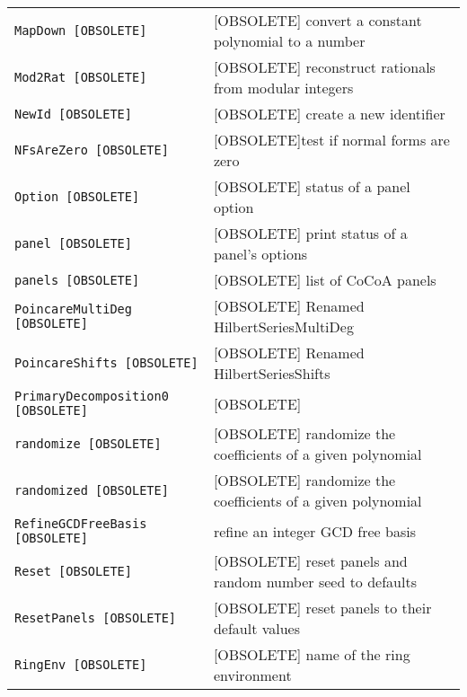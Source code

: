 \documentclass[a4paper]{mybook}
\begin{document}
\begin{center}
\begin{longtable}{ll}
{\verb~MapDown [OBSOLETE]~} &
      [OBSOLETE] convert a constant polynomial to a number\\
   
{\verb~Mod2Rat [OBSOLETE]~} &
      [OBSOLETE] reconstruct rationals from modular integers\\
   
{\verb~NewId [OBSOLETE]~} &
      [OBSOLETE] create a new identifier\\
   
{\verb~NFsAreZero [OBSOLETE]~} &
      [OBSOLETE]test if normal forms are zero\\
   
{\verb~Option [OBSOLETE]~} &
      [OBSOLETE] status of a panel option\\
   
{\verb~panel [OBSOLETE]~} &
      [OBSOLETE] print status of a panel's options\\
   
{\verb~panels [OBSOLETE]~} &
      [OBSOLETE] list of CoCoA panels\\
   
{\verb~PoincareMultiDeg [OBSOLETE]~} &
      [OBSOLETE] Renamed HilbertSeriesMultiDeg\\
   
{\verb~PoincareShifts [OBSOLETE]~} &
      [OBSOLETE] Renamed HilbertSeriesShifts\\
   
{\verb~PrimaryDecomposition0 [OBSOLETE]~} &
      [OBSOLETE]\\
   
{\verb~randomize [OBSOLETE]~} &
      [OBSOLETE] randomize the coefficients of a given polynomial\\
   
{\verb~randomized [OBSOLETE]~} &
      [OBSOLETE] randomize the coefficients of a given polynomial\\
   
{\verb~RefineGCDFreeBasis [OBSOLETE]~} &
      refine an integer GCD free basis\\
   
{\verb~Reset [OBSOLETE]~} &
      [OBSOLETE] reset panels and random number seed to defaults\\
   
{\verb~ResetPanels [OBSOLETE]~} &
      [OBSOLETE] reset panels to their default values\\
   
{\verb~RingEnv [OBSOLETE]~} &
      [OBSOLETE] name of the ring environment\\
   

\end{longtable}
\end{center}
\end{document}

